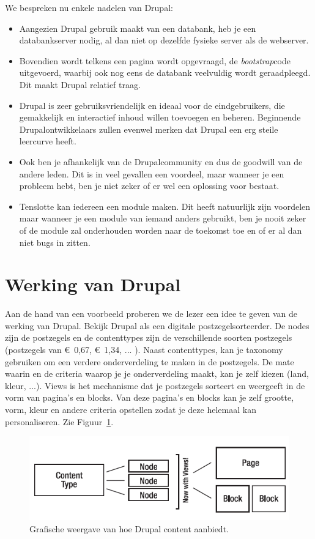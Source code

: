 We bespreken nu enkele nadelen van Drupal:
\begin{itemize}
\item Aangezien Drupal gebruik maakt van een databank, heb je een databankserver nodig, al dan niet op dezelfde fysieke server als de webserver.
\item Bovendien wordt telkens een pagina wordt opgevraagd, de \textit{bootstrap}code uitgevoerd, waarbij ook nog eens de databank veelvuldig wordt geraadpleegd. 
Dit maakt Drupal relatief traag.
\item Drupal is zeer gebruiksvriendelijk en ideaal voor de eindgebruikers, die gemakkelijk en interactief inhoud willen toevoegen en beheren. 
Beginnende Drupalontwikkelaars zullen evenwel merken dat Drupal een erg steile leercurve heeft.
\item Ook ben je afhankelijk van de Drupalcommunity en dus de goodwill van de andere leden. Dit is in veel gevallen een voordeel, maar wanneer je een probleem hebt, ben je niet zeker of er wel een oplossing voor bestaat.
\item Tenslotte kan iedereen een module maken. Dit heeft natuurlijk zijn voordelen maar wanneer je een module van iemand anders gebruikt, ben je nooit zeker of de module zal onderhouden worden naar de toekomst toe en of er al dan niet bugs in zitten.
\end{itemize}

\section{Werking van Drupal}

Aan de hand van een voorbeeld \cite{drupalDefGuide} proberen we de lezer een idee te geven van de werking van Drupal. Bekijk Drupal als een digitale postzegelsorteerder. De nodes zijn de postzegels en de contenttypes zijn de verschillende soorten postzegels (postzegels van \euro~0,67, \euro~1,34, ... ). Naast contenttypes, kan je taxonomy gebruiken om een verdere onderverdeling te maken in de postzegels. De mate waarin en de criteria waarop je je onderverdeling maakt, kan je zelf kiezen (land, kleur, ...). Views is het mechanisme dat je postzegels sorteert en weergeeft in de vorm van pagina's en blocks. Van deze pagina's en blocks kan je zelf grootte, vorm, kleur en andere criteria opstellen zodat je deze helemaal kan personaliseren. Zie Figuur~\ref{fig:drupalGrafischeWeergave}.

\begin{figure}[h]
\centering
\includegraphics{fig/drupalGrafischeWeergave}
\centering
\vspace{-10pt}
\caption{Grafische weergave van hoe Drupal content aanbiedt.}
\vspace{-10pt}
\label{fig:drupalGrafischeWeergave}
\end{figure}

